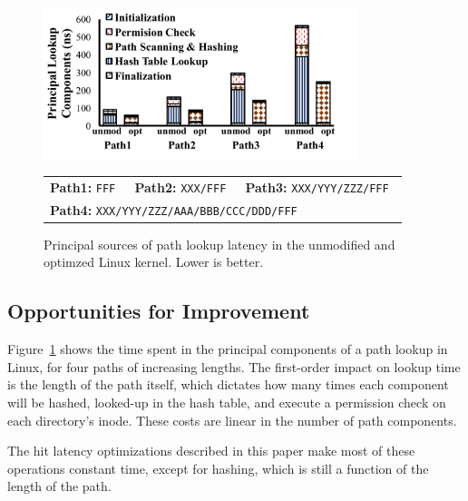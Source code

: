 \begin{figure}
\centering
\includegraphics[width=3.6in]{dcache/plots/lookup-breakdown.pdf} \\
\footnotesize
\begin{tabular}{lll}
{\bf Path1:} \tt FFF &
{\bf Path2:} \tt XXX/FFF &
{\bf Path3:} \tt XXX/YYY/ZZZ/FFF \\
\multicolumn{3}{l}{{\bf Path4:} \tt XXX/YYY/ZZZ/AAA/BBB/CCC/DDD/FFF} \\
\end{tabular}
\caption[Principal sources of unmodified and optimzied latency of path lookup]
{Principal sources of path lookup latency in the unmodified and optimzed Linux \linuxver{} kernel. Lower is better.}
\label{fig:dcache:breakdown}
\end{figure}

\subsection{Opportunities for Improvement}

Figure~\ref{fig:dcache:breakdown} shows the time spent in the principal components
of a path lookup in Linux, for four paths of increasing lengths.
The first-order impact on lookup time is the length of the path itself,
which dictates how many times each component will be hashed, looked-up in the 
hash table, and execute a permission check on each directory's inode.
These costs are linear in the number of path components.


The hit latency optimizations described in this paper make most of these 
operations constant time, except for hashing, which is still a function of the 
length of the path.  


